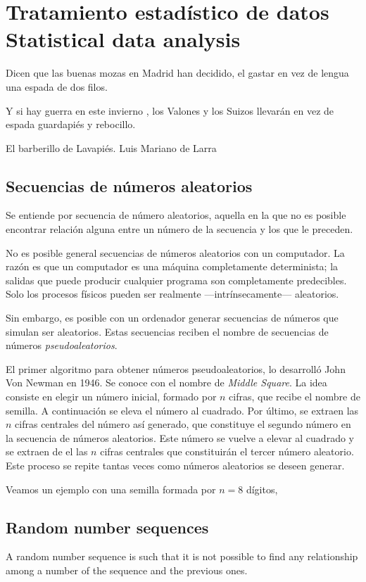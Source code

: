 \chapter{Tratamiento estadístico de datos\\ Statistical data analysis}
\epigraph{Dicen que las buenas mozas en Madrid han decidido, el gastar en vez de lengua una espada de dos filos.

Y si hay guerra en este invierno , los Valones y los Suizos llevarán en vez de espada guardapiés y rebocillo.}{El barberillo de Lavapiés. Luis Mariano de Larra}
\begin{paracol}{2}
\section{Secuencias de números aleatorios}
Se entiende por secuencia de número aleatorios, aquella en la que no es posible encontrar relación alguna entre un número de la secuencia y los que le preceden.

No es posible general secuencias de números aleatorios con un computador. La razón es que un computador es una máquina completamente determinista; la salidas que puede producir cualquier programa son completamente predecibles. Solo los procesos físicos pueden ser realmente ---intrínsecamente--- aleatorios.

Sin embargo, es posible con un ordenador generar secuencias de números que simulan ser aleatorios. Estas secuencias reciben el nombre de secuencias de números \emph{pseudoaleatorios}.

El primer algoritmo para obtener números pseudoaleatorios, lo desarrolló John Von Newman en 1946. Se conoce con el nombre de \emph{Middle Square}. La idea consiste en elegir un número inicial, formado por $n$ cifras, que recibe el nombre de semilla. A continuación se eleva el número al cuadrado. Por último, se extraen las $n$ cifras centrales del número así generado, que constituye el segundo número en la secuencia de números aleatorios. Este número se vuelve a elevar al cuadrado y se extraen de el las $n$ cifras centrales que constituirán el tercer número aleatorio. Este proceso se repite tantas veces como números aleatorios se deseen generar.

Veamos un ejemplo con una semilla  formada por $n=8$ dígitos,
\switchcolumn
\section{Random number sequences}
A random number sequence is such that it is not possible to find any relationship among a number of the sequence and the previous ones.


\end{paracol}
